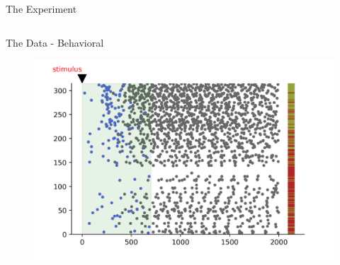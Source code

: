 \documentclass[10pt]{beamer}
\begin{document}
\begin{frame}[fragile]{The Experiment}
\begin{columns}[T,onlytextwidth]

  \end{columns}
\end{frame}

\begin{frame}[fragile]{The Data - Behavioral}
	\begin{center}
	\begin{figure}
      \includegraphics[width=\textwidth]{lickplot_single.png}
	\end{figure}
	\end{center}
\end{frame}
\end{document}
